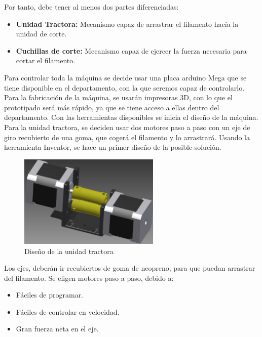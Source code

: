 Por tanto, debe tener al menos dos partes diferenciadas:

\begin{itemize}
	\item{\textbf{Unidad Tractora:} Mecanismo capaz de arrastrar el filamento hacía la unidad de corte.}
	\item{\textbf{Cuchillas de corte:} Mecanismo capaz de ejercer la fuerza necesaria para cortar el filamento.}
\end{itemize}

Para controlar toda la máquina se decide usar una placa arduino Mega que se tiene disponible en el departamento, con la que seremos capaz de controlarlo. Para la fabricación de la máquina, se usarán impresoras 3D, con lo que el prototipado será más rápido, ya que se tiene acceso a ellas dentro del departamento. Con las herramientas disponibles se inicia el diseño de la máquina.\\

Para la unidad tractora, se deciden usar dos motores paso a paso con un eje de giro recubierto de una goma, que cogerá el filamento y lo arrastrará. Usando la herramienta Inventor, se hace un primer diseño de la posible solución.

\begin{figure}[H]
    \centering
    \includegraphics[width=0.6\textwidth]{images/peletizadora/unidadtractora.png}
    \caption{Diseño de la unidad tractora}
    \label{fig:peletizadora_tractora}
\end{figure}

Los ejes, deberán ir recubiertos de goma de neopreno, para que puedan arrastrar del filamento. Se eligen motores paso a paso, debido a:

\begin{itemize}
	\item{Fáciles de programar.}
	\item{Fáciles de controlar en velocidad.}
	\item{Gran fuerza neta en el eje.}
\end{itemize}

